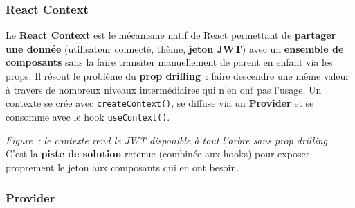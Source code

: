 \vspace{0.4cm}

\subsubsection*{React Context}
{}

\noindent Le \textbf{React Context} est le mécanisme natif de React permettant de \textbf{partager une donnée} (utilisateur connecté, thème, \textbf{jeton JWT}) avec un \textbf{ensemble de composants} sans la faire transiter manuellement de parent en enfant via les props. Il résout le problème du \textbf{\og{}prop drilling\fg{}}~: faire descendre une même valeur à travers de nombreux niveaux intermédiaires qui n'en ont pas l'usage. Un contexte se crée avec \texttt{createContext()}, se diffuse via un \textbf{Provider} et se consomme avec le hook \texttt{useContext()}.
\begin{center}
\end{center}
\noindent\textit{Figure~: le contexte rend le JWT disponible à tout l'arbre sans \og{}prop drilling\fg{}.} C'est la \textbf{piste de solution} retenue (combinée aux hooks) pour exposer proprement le jeton aux composants qui en ont besoin.

\newpage

\subsubsection*{Provider}
{}

